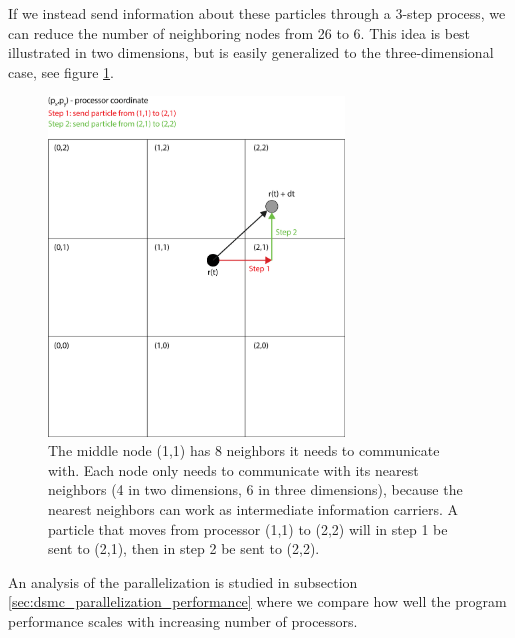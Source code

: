 If we instead send information about these particles through a 3-step process, we can reduce the number of neighboring nodes from 26 to 6. This idea is best illustrated in two dimensions, but is easily generalized to the three-dimensional case, see figure \ref{fig:parallelization_facet_technique}.
\begin{figure}[htpb]
\begin{center}
\includegraphics[width=0.7\textwidth, trim=0cm 0cm 0cm 0cm, clip]{DSMC/figures/parallelization_facet_technique.eps}
\end{center}
\caption{The middle node (1,1) has 8 neighbors it needs to communicate with. Each node only needs to communicate with its nearest neighbors (4 in two dimensions, 6 in three dimensions), because the nearest neighbors can work as intermediate information carriers. A particle that moves from processor (1,1) to (2,2) will in step 1 be sent to (2,1), then in step 2 be sent to (2,2).}
\label{fig:parallelization_facet_technique}
\end{figure}
An analysis of the parallelization is studied in subsection \ref{sec:dsmc_parallelization_performance} where we compare how well the program performance scales with increasing number of processors. 